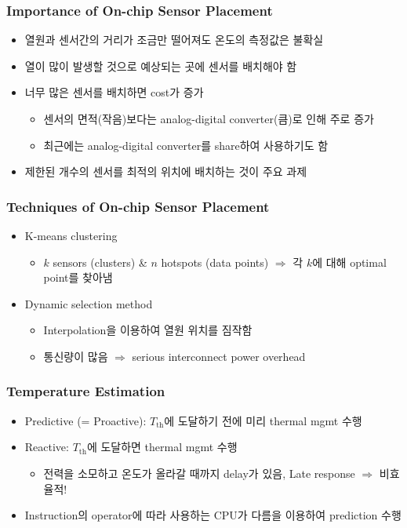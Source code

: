 \subsubsection*{Importance of On-chip Sensor Placement}
\begin{itemize}
    \item 열원과 센서간의 거리가 조금만 떨어져도 온도의 측정값은 불확실
    \item 열이 많이 발생할 것으로 예상되는 곳에 센서를 배치해야 함
    \item 너무 많은 센서를 배치하면 cost가 증가
    \begin{itemize}
        \item 센서의 면적(작음)보다는 analog-digital converter(큼)로 인해 주로 증가
        \item 최근에는 analog-digital converter를 share하여 사용하기도 함
    \end{itemize}
    \item 제한된 개수의 센서를 최적의 위치에 배치하는 것이 주요 과제
\end{itemize}

\subsubsection*{Techniques of On-chip Sensor Placement}
\begin{itemize}
    \item K-means clustering
    \begin{itemize}
        \item $k$ sensors (clusters) \& $n$ hotspots (data points) $\Rightarrow$ 각 $k$에 대해 optimal point를 찾아냄
    \end{itemize}
    \item Dynamic selection method
    \begin{itemize}
        \item Interpolation을 이용하여 열원 위치를 짐작함
        \item 통신량이 많음 $\Rightarrow$ serious interconnect power overhead
    \end{itemize}
\end{itemize}

\subsubsection*{Temperature Estimation}
\begin{itemize}
    \item Predictive (= Proactive): $T_{\mathrm{th}}$에 도달하기 전에 미리 thermal mgmt 수행
    \item Reactive: $T_{\mathrm{th}}$에 도달하면 thermal mgmt 수행
    \begin{itemize}
        \item 전력을 소모하고 온도가 올라갈 때까지 delay가 있음, Late response $\Rightarrow$ 비효율적!
    \end{itemize}
    \item Instruction의 operator에 따라 사용하는 CPU가 다름을 이용하여 prediction 수행
\end{itemize}

